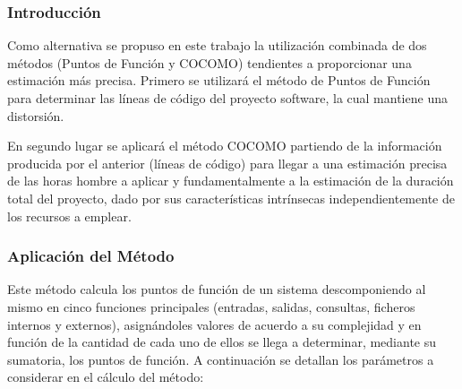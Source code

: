       \subsubsection{Introducción}
      
      Como alternativa se propuso en este trabajo la utilización combinada de dos métodos
(Puntos de Función y COCOMO) tendientes a proporcionar una estimación más precisa.
Primero se utilizará el  método de Puntos de Función para determinar las líneas de código del proyecto software, la cual mantiene una distorsión.

En segundo lugar se aplicará el método COCOMO partiendo de la información producida por el anterior (líneas de código) para llegar a una estimación precisa de las horas hombre a aplicar y fundamentalmente a la estimación de la duración total del proyecto, dado por sus características intrínsecas independientemente de los recursos a emplear.

      \subsubsection{Aplicación del Método}
      
      Este método calcula los puntos de función de un sistema descomponiendo al mismo en cinco funciones principales (entradas, salidas, consultas, ficheros internos y externos), asignándoles valores de acuerdo a su complejidad y en función de la cantidad de cada uno de ellos se llega a determinar, mediante su sumatoria, los puntos de función.
A continuación se detallan los parámetros a considerar en el cálculo del método:

